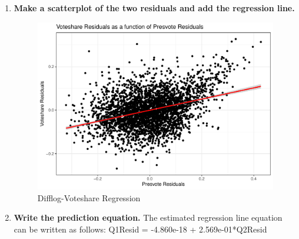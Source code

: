 \documentclass[12pt,letterpaper]{article}
\begin{document}
\begin{enumerate}
		
		\newpage	\item \textbf{Make a scatterplot of the two residuals and add the regression line.} 	\vspace{.25cm}
		
		
		
		\begin{figure}[!htbp]\centering
			\caption{\footnotesize Difflog-Voteshare Regression}
			\label{fig:plot_5}
			\includegraphics[width=.85\textwidth]{Q4graph.pdf}
		\end{figure}
		
		\item \textbf{Write the prediction equation.}
		\newline The estimated regression line equation can be written as follows: 
		\newline Q1Resid = -4.860e-18 + 2.569e-01*Q2Resid
	\end{enumerate}
	
	\newpage	
	
\end{document}
